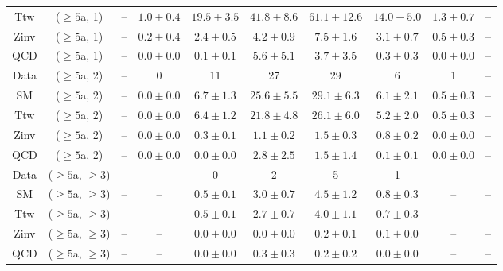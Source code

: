 \begin{table}[h!]
{\begin{tabular}{cccccccccc}
	Ttw & ($\ge5$a, 1) & -- & $1.0\pm 0.4$ & $19.5\pm 3.5$ & $41.8\pm 8.6$ & $61.1\pm 12.6$ & $14.0\pm 5.0$ & $1.3\pm 0.7$ & -- \\[0.5ex] 
	Zinv & ($\ge5$a, 1) & -- & $0.2\pm 0.4$ & $2.4\pm 0.5$ & $4.2\pm 0.9$ & $7.5\pm 1.6$ & $3.1\pm 0.7$ & $0.5\pm 0.3$ & -- \\[0.5ex] 
	QCD & ($\ge5$a, 1) & -- & $0.0\pm 0.0$ & $0.1\pm 0.1$ & $5.6\pm 5.1$ & $3.7\pm 3.5$ & $0.3\pm 0.3$ & $0.0\pm 0.0$ & -- \\[0.5ex] 
	Data & ($\ge5$a, 2) & -- & 0 & 11 & 27 & 29 & 6 & 1 & -- \\[0.5ex] 
	SM & ($\ge5$a, 2) & -- & $0.0\pm 0.0$ & $6.7\pm 1.3$ & $25.6\pm 5.5$ & $29.1\pm 6.3$ & $6.1\pm 2.1$ & $0.5\pm 0.3$ & -- \\[0.5ex] 
	Ttw & ($\ge5$a, 2) & -- & $0.0\pm 0.0$ & $6.4\pm 1.2$ & $21.8\pm 4.8$ & $26.1\pm 6.0$ & $5.2\pm 2.0$ & $0.5\pm 0.3$ & -- \\[0.5ex] 
	Zinv & ($\ge5$a, 2) & -- & $0.0\pm 0.0$ & $0.3\pm 0.1$ & $1.1\pm 0.2$ & $1.5\pm 0.3$ & $0.8\pm 0.2$ & $0.0\pm 0.0$ & -- \\[0.5ex] 
	QCD & ($\ge5$a, 2) & -- & $0.0\pm 0.0$ & $0.0\pm 0.0$ & $2.8\pm 2.5$ & $1.5\pm 1.4$ & $0.1\pm 0.1$ & $0.0\pm 0.0$ & -- \\[0.5ex] 
	Data & ($\ge5$a, $\ge3$) & -- & -- & 0 & 2 & 5 & 1 & -- & -- \\[0.5ex] 
	SM & ($\ge5$a, $\ge3$) & -- & -- & $0.5\pm 0.1$ & $3.0\pm 0.7$ & $4.5\pm 1.2$ & $0.8\pm 0.3$ & -- & -- \\[0.5ex] 
	Ttw & ($\ge5$a, $\ge3$) & -- & -- & $0.5\pm 0.1$ & $2.7\pm 0.7$ & $4.0\pm 1.1$ & $0.7\pm 0.3$ & -- & -- \\[0.5ex] 
	Zinv & ($\ge5$a, $\ge3$) & -- & -- & $0.0\pm 0.0$ & $0.0\pm 0.0$ & $0.2\pm 0.1$ & $0.1\pm 0.0$ & -- & -- \\[0.5ex] 
	QCD & ($\ge5$a, $\ge3$) & -- & -- & $0.0\pm 0.0$ & $0.3\pm 0.3$ & $0.2\pm 0.2$ & $0.0\pm 0.0$ & -- & -- \\[0.5ex] 
	\hline
	\hline
\end{tabular}}
\end{table}
